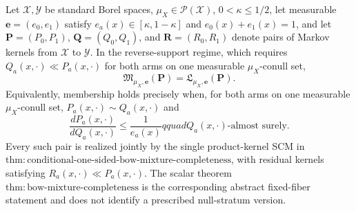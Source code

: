 Let \(\mathcal X,\mathcal Y\) be standard Borel spaces, \(\mu_X\in\mathcal P(\mathcal X)\), \(0<\kappa\le1/2\), let measurable \(\boldsymbol e=(e_0,e_1)\) satisfy \(e_a(x)\in[\kappa,1-\kappa]\) and \(e_0(x)+e_1(x)=1\), and let \(\boldsymbol P=(P_0,P_1)\), \(\boldsymbol Q=(Q_0,Q_1)\), and \(\boldsymbol R=(R_0,R_1)\) denote pairs of Markov kernels from \(\mathcal X\) to \(\mathcal Y\).  In the reverse-support regime, which requires \(Q_a(x,\cdot)\ll P_a(x,\cdot)\) for both arms on one measurable \(\mu_X\)-conull set,
\[
 \mathfrak M_{\mu_X,\boldsymbol e}(\boldsymbol P)=\mathfrak L_{\mu_X,\boldsymbol e}(\boldsymbol P).
\]
Equivalently, membership holds precisely when, for both arms on one measurable \(\mu_X\)-conull set, \(P_a(x,\cdot)\sim Q_a(x,\cdot)\) and
\[
 \frac{dP_a(x,\cdot)}{dQ_a(x,\cdot)}\le\frac1{e_a(x)}qquad Q_a(x,\cdot)\text{-almost surely}.
\]
Every such pair is realized jointly by the single product-kernel SCM in \(\mathrm{thm:conditional\text{-}one\text{-}sided\text{-}bow\text{-}mixture\text{-}completeness}\), with residual kernels satisfying \(R_a(x,\cdot)\ll P_a(x,\cdot)\).  The scalar theorem \(\mathrm{thm:bow\text{-}mixture\text{-}completeness}\) is the corresponding abstract fixed-fiber statement and does not identify a prescribed null-stratum version.